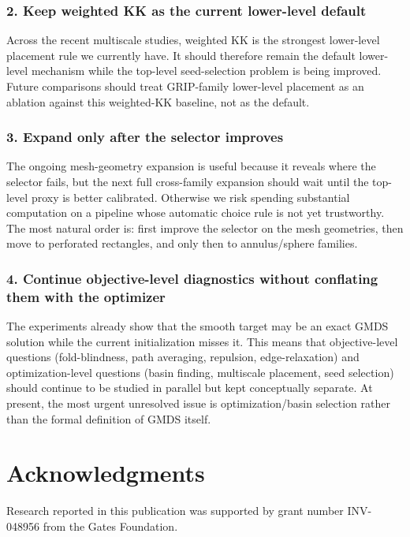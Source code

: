 \documentclass[11pt]{article}
\begin{document}
\subsubsection*{2. Keep weighted KK as the current lower-level default}
Across the recent multiscale studies, weighted KK is the strongest lower-level
placement rule we currently have.  It should therefore remain the default
lower-level mechanism while the top-level seed-selection problem is being
improved.  Future comparisons should treat GRIP-family lower-level placement as
an ablation against this weighted-KK baseline, not as the default.

\subsubsection*{3. Expand only after the selector improves}
The ongoing mesh-geometry expansion is useful because it reveals where the
selector fails, but the next full cross-family expansion should wait until the
top-level proxy is better calibrated.  Otherwise we risk spending substantial
computation on a pipeline whose automatic choice rule is not yet trustworthy.
The most natural order is: first improve the selector on the mesh geometries,
then move to perforated rectangles, and only then to annulus/sphere families.

\subsubsection*{4. Continue objective-level diagnostics without conflating them with
the optimizer}
The experiments already show that the smooth target may be an exact GMDS
solution while the current initialization misses it.  This means that
objective-level questions (fold-blindness, path averaging, repulsion,
edge-relaxation) and optimization-level questions (basin finding, multiscale
placement, seed selection) should continue to be studied in parallel but kept
conceptually separate.  At present, the most urgent unresolved issue is
optimization/basin selection rather than the formal definition of GMDS itself.


\section*{Acknowledgments}
Research reported in this publication was supported by grant number
INV-048956 from the Gates Foundation.



\end{document}
